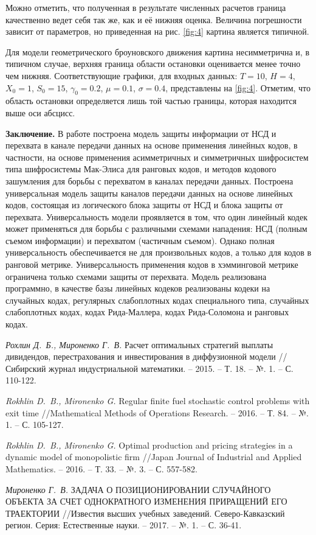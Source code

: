 \documentclass[twoside,12pt]{article}
\begin{document}
Можно отметить, что полученная в результате численных расчетов граница качественно ведет себя так же, как и её нижняя оценка. Величина погрешности зависит от параметров, но приведенная на рис. \ref{fig:4} картина является типичной.

Для модели геометрического броуновского движения картина несимметрична и, в типичном случае, верхняя граница области остановки оценивается менее точно чем нижняя. Соответствующие графики, для входных данных: $T=10$, $H=4$, $X_0=1$, $S_0=15$, $\gamma_0=0.2$, $\mu=0.1$, $\sigma=0.4$, представлены на \ref{fig:4}.
Отметим, что область остановки определяется лишь той частью границы, которая находится выше оси абсцисс.

\textbf{Заключение.} В работе построена модель защиты информации от НСД и перехвата в канале передачи данных на основе применения линейных кодов, в частности, на основе применения асимметричных и симметричных шифросистем типа шифросистемы Мак-Элиса для ранговых кодов, и методов кодового зашумления для борьбы с перехватом в каналах передачи данных. Построена универсальная модель защиты каналов передачи данных на основе линейных кодов, состоящая из логического блока защиты от НСД и блока защиты от перехвата. Универсальность модели проявляется в том, что один линейный кодек может применяться для борьбы с различными схемами нападения: НСД (полным съемом информации) и перехватом (частичным съемом). Однако полная универсальность обеспечивается не для произвольных кодов, а только для кодов в ранговой метрике. Универсальность применения кодов в хэмминговой метрике ограничена только схемами защиты от перехвата. Модель реализована программно, в качестве базы линейных кодеков реализованы кодеки на случайных кодах, регулярных слабоплотных кодах специального типа, случайных слабоплотных кодах, кодах Рида-Маллера, кодах Рида-Соломона и ранговых кодах.

\vspace{-10mm} \begin{thebibliography}{99} \small

 {\it Рохлин Д.~Б., Мироненко Г.~В.} Расчет оптимальных стратегий выплаты дивидендов, перестрахования и инвестирования в диффузионной модели //Сибирский журнал индустриальной математики. – 2015. – Т. 18. – №. 1. – С. 110-122.

  {\it Rokhlin D.~B., Mironenko G.} Regular finite fuel stochastic control problems with exit time //Mathematical Methods of Operations Research. – 2016. – Т. 84. – №. 1. – С. 105-127.

 {\it Rokhlin D.~B., Mironenko G.} Optimal production and pricing strategies in a dynamic model of monopolistic firm //Japan Journal of Industrial and Applied Mathematics. – 2016. – Т. 33. – №. 3. – С. 557-582.

 {\it  Мироненко Г.~В.} ЗАДАЧА О ПОЗИЦИОНИРОВАНИИ СЛУЧАЙНОГО ОБЪЕКТА ЗА СЧЕТ ОДНОКРАТНОГО ИЗМЕНЕНИЯ ПРИРАЩЕНИЙ ЕГО ТРАЕКТОРИИ //Известия высших учебных заведений. Северо-Кавказский регион. Серия: Естественные науки. – 2017. – №. 1. – С. 36-41.

\end{thebibliography}
\end{document}
